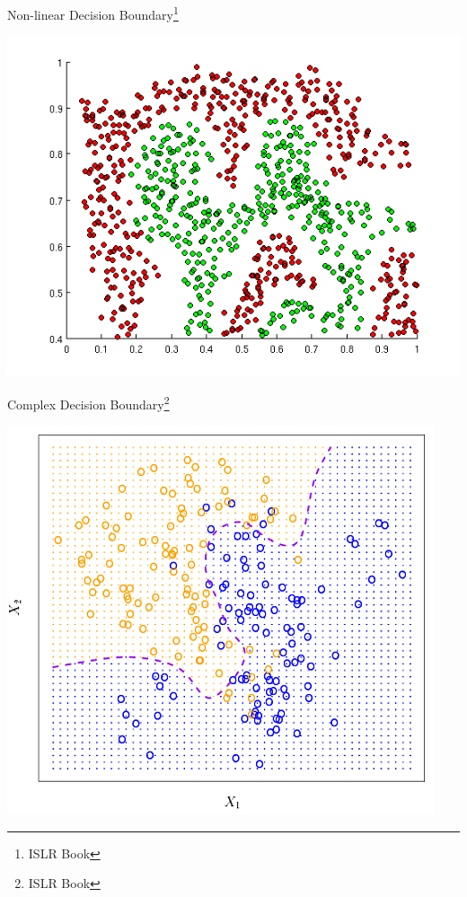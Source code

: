 \documentclass{beamer}
\begin{document}
\begin{frame}{Non-linear Decision Boundary\footnote{ISLR Book}}
    \begin{center}
        \includegraphics[scale=0.5]{nonlinearDecisionBoundary.png}
    \end{center}
\end{frame}
\begin{frame}{Complex Decision Boundary\footnote{ISLR Book}}
    \begin{center}
        \includegraphics[scale=0.5]{complexDecisionBoundary.png}
    \end{center}
\end{frame}
\end{document}
